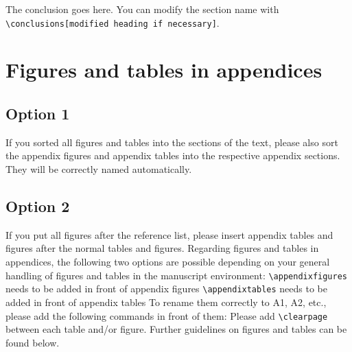 \documentclass[gc, manuscript]{copernicus}
\begin{document}
\conclusions

The conclusion goes here.
You can modify the section name with \texttt{\textbackslash{}conclusions{[}modified\ heading\ if\ necessary{]}}.








\appendix
\section{Figures and tables in appendices}
\subsection{Option 1}

If you sorted all figures and tables into the sections of the text, please also sort the appendix figures and appendix tables into the respective appendix sections.
They will be correctly named automatically.

\subsection{Option 2}

If you put all figures after the reference list, please insert appendix tables and figures after the normal tables and figures.
Regarding figures and tables in appendices, the following two options are possible depending on your general handling of figures and tables in the manuscript environment:
\texttt{\textbackslash{}appendixfigures} needs to be added in front of appendix figures
\texttt{\textbackslash{}appendixtables} needs to be added in front of appendix tables
To rename them correctly to A1, A2, etc., please add the following commands in front of them:
Please add \texttt{\textbackslash{}clearpage} between each table and/or figure. Further guidelines on figures and tables can be found below.
\noappendix


\end{document}
